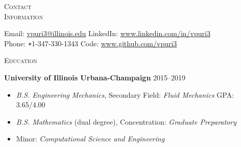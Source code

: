 \documentclass[10pt]{article}
\begin{document}
\begin{multicols}{2}
\textsc{\small Contact \\ Information}
\columnbreak

Email: \href{mailto:vpuri3@illinois.edu}{vpuri3@illinois.edu}
\hfill LinkedIn: \url{www.linkedin.com/in/vpuri3}\\
Phone: \texttt{+}1-347-330-1343                              
\hfill Code:     \url{www.github.com/vpuri3}

\end{multicols}
\vspace{-1.5em}
%
%
\begin{multicols}{2}
\textsc{\small Education}
\columnbreak

\textbf{University of Illinois Urbana-Champaign} \hfill 2015--2019

\vspace{-2.0em}
\begin{itemize}[label= ]
    \setlength\itemsep{-0.5em}
    \item {\sl B.S. Engineering Mechanics}, Secondary Field: {\sl Fluid Mechanics} \hfill GPA: 3.65/4.00
    \item {\sl B.S. Mathematics} (dual degree), Concentration: {\sl Graduate Preparatory}
    \item  Minor: {\sl Computational Science and Engineering}
\end{itemize}
\vspace{-2.0em}

\end{multicols}
\vspace{-1.5em}
\end{document}

